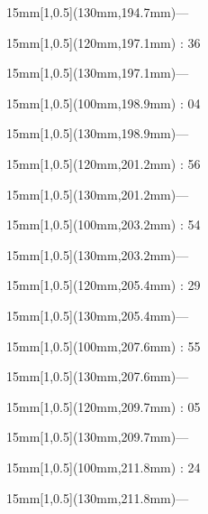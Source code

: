\documentclass[a4paper]{memoir}
\begin{document}
\begin{textblock*}{15mm}[1,0.5](130mm,194.7mm)\flushright —\end{textblock*}
\begin{textblock*}{15mm}[1,0.5](120mm,197.1mm) : 36\end{textblock*}
\begin{textblock*}{15mm}[1,0.5](130mm,197.1mm)\flushright —\end{textblock*}
\begin{textblock*}{15mm}[1,0.5](100mm,198.9mm) : 04\end{textblock*}
\begin{textblock*}{15mm}[1,0.5](130mm,198.9mm)\flushright —\end{textblock*}
\begin{textblock*}{15mm}[1,0.5](120mm,201.2mm) : 56\end{textblock*}
\begin{textblock*}{15mm}[1,0.5](130mm,201.2mm)\flushright —\end{textblock*}
\begin{textblock*}{15mm}[1,0.5](100mm,203.2mm) : 54\end{textblock*}
\begin{textblock*}{15mm}[1,0.5](130mm,203.2mm)\flushright —\end{textblock*}
\begin{textblock*}{15mm}[1,0.5](120mm,205.4mm) : 29\end{textblock*}
\begin{textblock*}{15mm}[1,0.5](130mm,205.4mm)\flushright —\end{textblock*}
\begin{textblock*}{15mm}[1,0.5](100mm,207.6mm) : 55\end{textblock*}
\begin{textblock*}{15mm}[1,0.5](130mm,207.6mm)\flushright —\end{textblock*}
\begin{textblock*}{15mm}[1,0.5](120mm,209.7mm) : 05\end{textblock*}
\begin{textblock*}{15mm}[1,0.5](130mm,209.7mm)\flushright —\end{textblock*}
\begin{textblock*}{15mm}[1,0.5](100mm,211.8mm) : 24\end{textblock*}
\begin{textblock*}{15mm}[1,0.5](130mm,211.8mm)\flushright —\end{textblock*}
\end{document}
